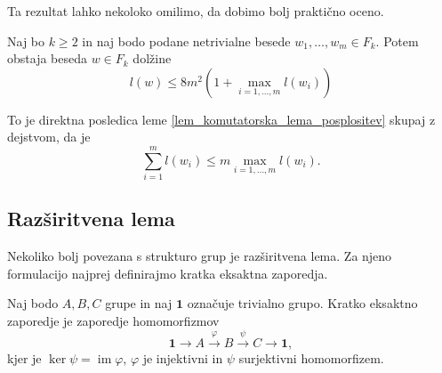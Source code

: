 \documentclass[mat1, tisk]{fmfdelo}
\numberwithin{equation}{section}  %
\begin{document}
Ta rezultat lahko nekoloko omilimo, da dobimo bolj praktično oceno.
\begin{posledica}
\label{psl_komutatorska_lema_prakticna}
Naj bo $k \ge 2$ in naj bodo podane netrivialne besede $w_1, \ldots, w_m \in  F_k$. Potem obstaja beseda $w \in  F_k$ dolžine \begin{equation*}
l(w) \le 8m^2 \left(1 + \max_{i = 1, \ldots, m} l(w_i) \right)
\end{equation*}      
\end{posledica}
\begin{dokaz}
    To je direktna posledica leme \ref{lem_komutatorska_lema_posplositev} skupaj z dejstvom, da je \begin{equation*}
    \sum_{i = 1}^{m} l(w_{i}) \le m \max_{i = 1, \ldots, m} l(w_i).
    \end{equation*}  
\end{dokaz}


\subsection{Razširitvena lema}

Nekoliko bolj povezana s strukturo grup je razširitvena lema. Za njeno formulacijo najprej definirajmo kratka eksaktna zaporedja.
\begin{definicija}
\label{def_kratko_eksaktno_zaporedje}
Naj bodo $A, B, C$ grupe in naj $\mathbf{1}$ označuje trivialno grupo. Kratko eksaktno zaporedje je zaporedje homomorfizmov
\begin{equation*}
\mathbf{1} \to A \xrightarrow{\varphi} B \xrightarrow{\psi} C \to \mathbf{1},
\end{equation*}  
kjer je $\ker \psi = \operatorname{im} \varphi$, $\varphi$ je injektivni in $\psi$ surjektivni homomorfizem.
\end{definicija}
\end{document}

